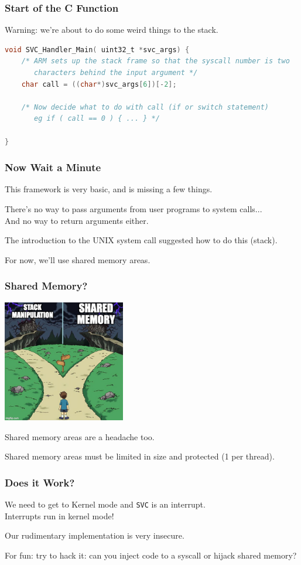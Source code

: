 \begin{frame}[fragile]
\frametitle{Start of the C Function}
Warning: we're about to do some weird things to the stack.

\begin{lstlisting}[language=C]
void SVC_Handler_Main( uint32_t *svc_args) {
    /* ARM sets up the stack frame so that the syscall number is two
       characters behind the input argument */
    char call = ((char*)svc_args[6])[-2];
    
    /* Now decide what to do with call (if or switch statement)
       eg if ( call == 0 ) { ... } */

}
\end{lstlisting}

\end{frame}

\begin{frame}
\frametitle{Now Wait a Minute}

This framework is very basic, and is missing a few things.

There's no way to pass arguments from user programs to system calls...\\
\quad And no way to return arguments either.

The introduction to the UNIX system call suggested how to do this (stack).

For now, we'll use shared memory areas.

\end{frame}

\begin{frame}
\frametitle{Shared Memory?}

\begin{center}
  \includegraphics[width=0.4\textwidth]{images/twocastles.jpg}
\end{center}

Shared memory areas are a headache too.

Shared memory areas must be limited in size and protected (1 per thread).

\end{frame}

\begin{frame}
\frametitle{Does it Work?}

We need to get to Kernel mode and \texttt{SVC} is an interrupt.\\
\quad Interrupts run in kernel mode!

Our rudimentary implementation is very insecure.

For fun: try to hack it: can you inject code to a syscall or hijack shared memory?

\end{frame}




